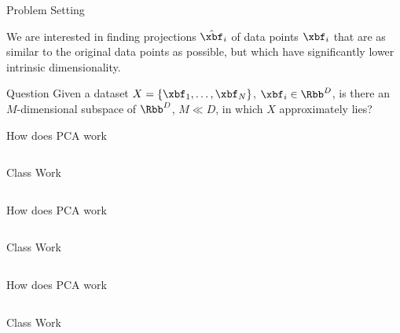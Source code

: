 \documentclass[aspectratio=169,xcolor=dvipsnames,svgnames,x11names,fleqn]{beamer}
\begin{document}

\begin{frame}{Problem Setting}

    \Large 
    \begin{center}
                We are interested in finding projections $\hat{\xbf}_i$ of data points $\xbf_i$ that are as similar to the original data points as possible, but which have significantly lower intrinsic dimensionality.
    \end{center}
    
    \begin{tblock}{Question}
            Given a dataset $X = \{ \xbf_1, \ldots, \xbf_N\}$, $\xbf_i\in \Rbb^D$, is there an $M$-dimensional subspace of $\Rbb^D$, $M \ll D$, in which $X$ approximately lies?
    \end{tblock}

\end{frame}



\begin{frame}{How does PCA work}
    \begin{columns}

    {\color{lightgray}Class Work}

    \end{columns}
\end{frame}


\begin{frame}{How does PCA work}
    \begin{columns}

    {\color{lightgray}Class Work}

    \end{columns}
\end{frame}


\begin{frame}{How does PCA work}
    \begin{columns}

    {\color{lightgray}Class Work}
       

    \end{columns}
\end{frame}
\end{document}
